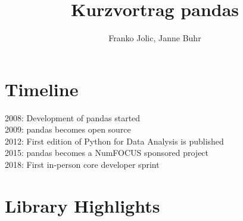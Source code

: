 \documentclass[a4paper, 11pt]{article}
\title{Kurzvortrag pandas}
\author{Franko Jolic, Janne Buhr}
\begin{document}
\begin{titlepage}
    \maketitle
    \tableofcontents
    \vfill
\end{titlepage}

\section{Timeline}

2008: Development of pandas started\\
2009: pandas becomes open source\\
2012: First edition of Python for Data Analysis is published\\
2015: pandas becomes a NumFOCUS sponsored project\\
2018: First in-person core developer sprint\\

\section{Library Highlights}
\end{document}
